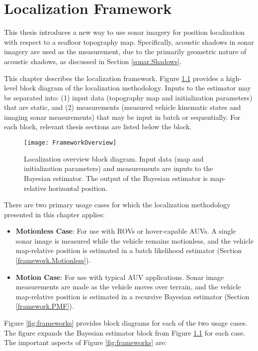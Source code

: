 
\chapter{Localization Framework}
\label{ch.Framework}

This thesis introduces a new way to use sonar imagery for position localization with respect to a seafloor topography map.
Specifically, acoustic shadows in sonar imagery are used as the measurement, due to the primarily geometric nature of acoustic shadows, as discussed in Section \ref{sonar.Shadows}.

This chapter describes the localization framework.  
Figure \ref{fig:frameworkOverview} provides a high-level block diagram of the localization methodology.
Inputs to the estimator may be separated into: (1) input data (topography map and initialization parameters) that are static, and (2) measurements (measured vehicle kinematic states and imaging sonar measurements) that may be input in batch or sequentially.
For each block, relevant thesis sections are listed below the block.

\begin{figure}[!h]
	\centering
		\texttt{[image: FrameworkOverview]}
	\caption{Localization overview block diagram. Input data (map and initialization parameters) and measurements are inputs to the Bayesian estimator.  The output of the Bayesian estimator is map-relative horizontal position.}
	\label{fig:frameworkOverview}
\end{figure}

There are two primary usage cases for which the localization methodology presented in this chapter applies:

\begin{itemize}
\item \textbf{Motionless Case}: For use with ROVs or hover-capable AUVs.  A single sonar image is measured while the vehicle remains motionless, and the vehicle map-relative position is estimated in a batch likelihood estimator (Section \ref{framework.Motionless}).
\item \textbf{Motion Case}: For use with typical AUV applications. Sonar image measurements are made as the vehicle moves over terrain, and the vehicle map-relative position is estimated in a recursive Bayesian estimator (Section \ref{framework.PMF}).
\end{itemize}

\noindent Figure \ref{fig:frameworks} provides block diagrams for each of the two usage cases.
The figure expands the Bayesian estimator block from Figure \ref{fig:frameworkOverview} for each case.
The important aspects of Figure \ref{fig:frameworks} are:

